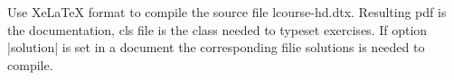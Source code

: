 Use XeLaTeX format to compile the source file lcourse-hd.dtx. Resulting pdf is the documentation, cls file is the class needed to typeset exercises. If option |solution| is set in a document the corresponding filie solutions is needed to compile.
